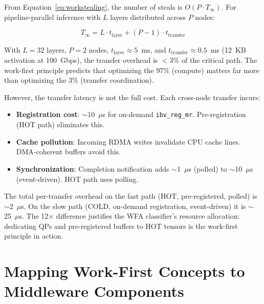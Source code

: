 \documentclass[11pt,letterpaper]{article}
\begin{document}
From Equation~\ref{eq:workstealing}, the number of steals is $O(P \cdot T_\infty)$. For pipeline-parallel inference with $L$ layers distributed across $P$ nodes:

\begin{equation}
    T_\infty = L \cdot t_\text{layer} + (P-1) \cdot t_\text{transfer}
\end{equation}

With $L = 32$ layers, $P = 2$ nodes, $t_\text{layer} \approx 5$~ms, and $t_\text{transfer} \approx 0.5$~ms (12~KB activation at 100~Gbps), the transfer overhead is $<$3\% of the critical path. The work-first principle predicts that optimizing the 97\% (compute) matters far more than optimizing the 3\% (transfer coordination).

However, the transfer latency is not the full cost. Each cross-node transfer incurs:

\begin{itemize}
    \item \textbf{Registration cost}: $\sim$10~$\mu$s for on-demand \texttt{ibv\_reg\_mr}. Pre-registration (HOT path) eliminates this.
    \item \textbf{Cache pollution}: Incoming RDMA writes invalidate CPU cache lines. DMA-coherent buffers avoid this.
    \item \textbf{Synchronization}: Completion notification adds $\sim$1~$\mu$s (polled) to $\sim$10~$\mu$s (event-driven). HOT path uses polling.
\end{itemize}

The total per-transfer overhead on the fast path (HOT, pre-registered, polled) is $\sim$2~$\mu$s. On the slow path (COLD, on-demand registration, event-driven) it is $\sim$25~$\mu$s. The 12$\times$ difference justifies the WFA classifier's resource allocation: dedicating QPs and pre-registered buffers to HOT tensors is the work-first principle in action.

\section{Mapping Work-First Concepts to Middleware Components}
\label{sec:mapping}
\end{document}
